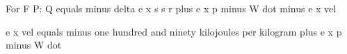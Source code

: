 For F P: Q equals minus delta e x s s r plus e x p minus W dot minus e x vel

e x vel equals minus one hundred and ninety kilojoules per kilogram plus e x p minus W dot